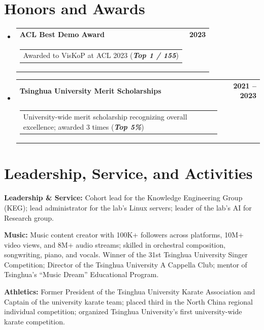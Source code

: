 \documentclass[letterpaper,11pt,UTF8]{article}
\makeatletter
\newcommand{\highlight}[1]{\textcolor[RGB]{150,0,0}{\textbf{\textit{#1}}}}
\newcommand{\resumeItem}[1]{
  \item\small{
    {#1}
  }
}
\newcommand{\resumeSubheading}[4]{
  \vspace{-2pt}\item
    \begin{tabular*}{1.0\textwidth}[t]{@{}l@{\extracolsep{\fill}}r@{}}
      \textbf{#1} & \textbf{\small #2} \\[1pt]
      {\renewcommand{\arraystretch}{0.9}%
      \begin{tabular}[t]{@{}l@{}}\small #3\end{tabular}} & {\small #4} \\
    \end{tabular*}\vspace{-7pt}
}
\newcommand{\resumeSubHeadingListStart}{\begin{itemize}[leftmargin=0.0in, label={}]}
\newcommand{\resumeSubHeadingListEnd}{\end{itemize}}
\newcommand{\resumeItemListStart}{\begin{itemize}[leftmargin=18pt, topsep=0pt, itemsep=3pt, parsep=0pt, partopsep=0pt]}
\newcommand{\resumeItemListEnd}{\end{itemize}\vspace{-5pt}}
\makeatother
\begin{document}
\vspace{0.005in}
\section{Honors and Awards}

\resumeSubHeadingListStart
\resumeSubheading
{ACL Best Demo Award}{2023}{Awarded to \textup{VisKoP} at \textup{ACL 2023} (\highlight{Top 1 / 155})}{}
\resumeSubheading
{Tsinghua University Merit Scholarships}{2021 -- 2023}{University-wide merit scholarship recognizing overall excellence; awarded \textup{3} times (\highlight{Top 5\%})}{}
\resumeSubHeadingListEnd








\vspace{0.005in}
\section{Leadership, Service, and Activities}

\vspace{3pt}
\resumeItemListStart
  \resumeItem{\textbf{Leadership \& Service:} Cohort lead for the Knowledge Engineering Group (KEG); lead administrator for the lab's Linux servers; leader of the lab's AI for Research group.
  \resumeItem{\textbf{Music:} Music content creator with 100K+ followers across platforms, 10M+ video views, and 8M+ audio streams; skilled in orchestral composition, songwriting, piano, and vocals. Winner of the 31st Tsinghua University Singer Competition; Director of the Tsinghua University A Cappella Club; mentor of Tsinghua's ``Music Dream'' Educational Program.}
  \resumeItem{\textbf{Athletics:} Former President of the Tsinghua University Karate Association and Captain of the university karate team; placed third in the North China regional individual competition; organized Tsinghua University's first university-wide karate competition.}
}
\resumeItemListEnd
\vspace{3pt}
\end{document}
